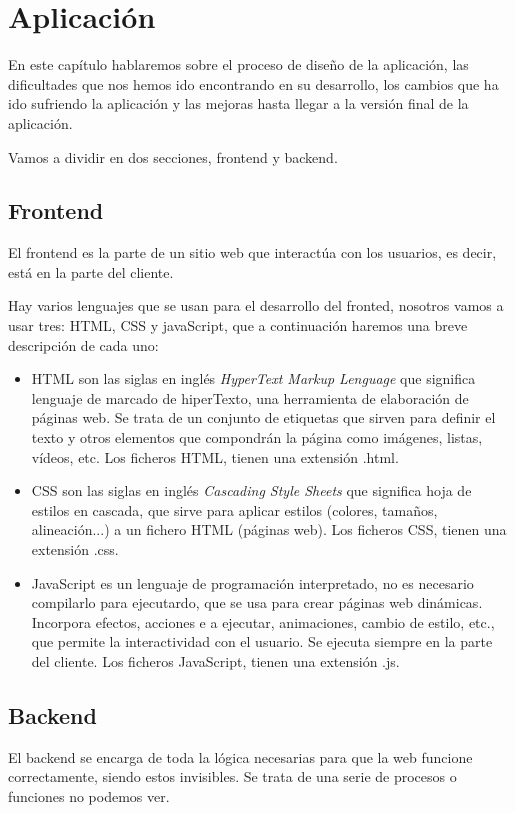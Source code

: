 \chapter{Aplicación}
\label{cap:aplicacion}

En este capítulo hablaremos sobre el proceso de diseño de la aplicación, las dificultades que nos hemos ido encontrando en su desarrollo, los cambios que ha ido sufriendo la aplicación y las mejoras hasta llegar a la versión final de la aplicación.

Vamos a dividir en dos secciones, frontend y backend.

\section{Frontend}

El frontend es la parte de un sitio web que interactúa con los usuarios, es decir, está en la parte del cliente. 

Hay varios lenguajes que se usan para el desarrollo del fronted, nosotros vamos a usar tres: HTML, CSS y javaScript, que a continuación haremos una breve descripción de cada uno:
 
\begin{itemize}
	\item HTML son las siglas en inglés \textit{HyperText Markup Lenguage} que significa lenguaje de marcado de hiperTexto, una herramienta de elaboración de páginas web. Se trata de un conjunto de etiquetas que sirven para definir el texto y otros elementos que compondrán la página como imágenes, listas, vídeos, etc. Los ficheros HTML, tienen una extensión .html.
	
	\item CSS son las siglas en inglés \textit{Cascading Style Sheets} que significa hoja de estilos en cascada, que sirve para aplicar estilos (colores, tamaños, alineación...) a un fichero HTML (páginas web). Los ficheros CSS, tienen una extensión .css.
	
		\item JavaScript es un lenguaje de programación interpretado, no es necesario compilarlo para ejecutardo, que se usa para crear páginas web dinámicas. Incorpora efectos, acciones e a ejecutar, animaciones, cambio de estilo, etc., que permite la interactividad con el usuario. Se ejecuta siempre en la parte del cliente. Los ficheros JavaScript, tienen una extensión .js.
	
\end{itemize}

\section{Backend}

El backend se encarga de toda la lógica necesarias para que la web funcione correctamente, siendo estos invisibles. Se trata de una serie de procesos o funciones no podemos ver.